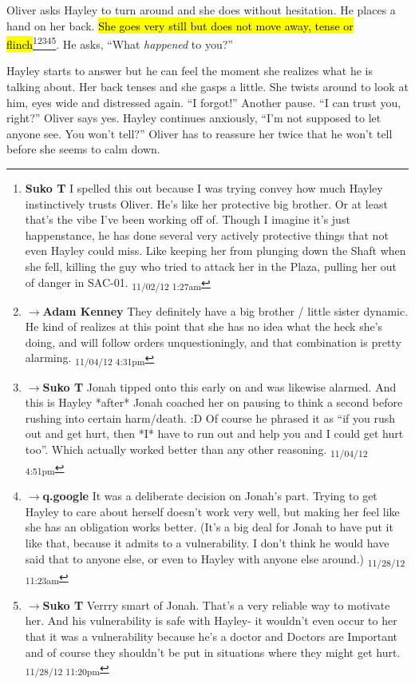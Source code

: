 Oliver asks Hayley to turn around and she does without hesitation.  He places a hand on her back.  \hl{She goes very still but does not move away, tense or flinch}\footnote{\textbf{Suko T }I spelled this out because I was trying convey how much Hayley instinctively trusts Oliver.  He's like her protective big brother.  Or at least that's the vibe I've been working off of.  Though I imagine it's just happenstance, he has done several very actively protective things that not even Hayley could miss. Like keeping her from plunging down the Shaft when she fell, killing the guy who tried to attack her in the Plaza, pulling her out of danger in SAC-01. \textsubscript{11/02/12 1:27am}}\footnote{$\rightarrow$\textbf{Adam Kenney }They definitely have a big brother / little sister dynamic.  He kind of realizes at this point that she has no idea what the heck she's doing, and will follow orders unquestioningly, and that combination is pretty alarming. \textsubscript{11/04/12 4:31pm}}\footnote{$\rightarrow$\textbf{Suko T }Jonah tipped onto this early on and was likewise alarmed.  And this is Hayley *after* Jonah coached her on pausing to think a second before rushing into certain harm/death. :D  Of course he phrased it as ``if you rush out and get hurt, then *I* have to run out and help you and I could get hurt too''.  Which actually worked better than any other reasoning. \textsubscript{11/04/12 4:51pm}}\footnote{$\rightarrow$\textbf{q.google }It was a deliberate decision on Jonah's part. Trying to get Hayley to care about herself doesn't work very well, but making her feel like she has an obligation works better.  (It's a big deal for Jonah to have put it like that, because it admits to a vulnerability.  I don't think he would have said that to anyone else, or even to Hayley with anyone else around.) \textsubscript{11/28/12 11:23am}}\footnote{$\rightarrow$\textbf{Suko T }Verrry smart of Jonah.  That's a very reliable way to motivate her. And his vulnerability is safe with Hayley- it wouldn't even occur to her that it was a vulnerability because he's a doctor and Doctors are Important and of course they shouldn't be put in situations where they might get hurt. \textsubscript{11/28/12 11:20pm}}. He asks, ``What \textit{happened }to you?''



Hayley starts to answer but he can feel the moment she realizes what he is talking about.  Her back tenses and she gasps a little.  She twists around to look at him, eyes wide and distressed again.  ``I forgot!''  Another pause.  ``I can trust you, right?''  Oliver says yes.  Hayley continues anxiously, ``I'm not supposed to let anyone see.  You won't tell?''  Oliver has to reassure her twice that he won't tell before she seems to calm down.  



